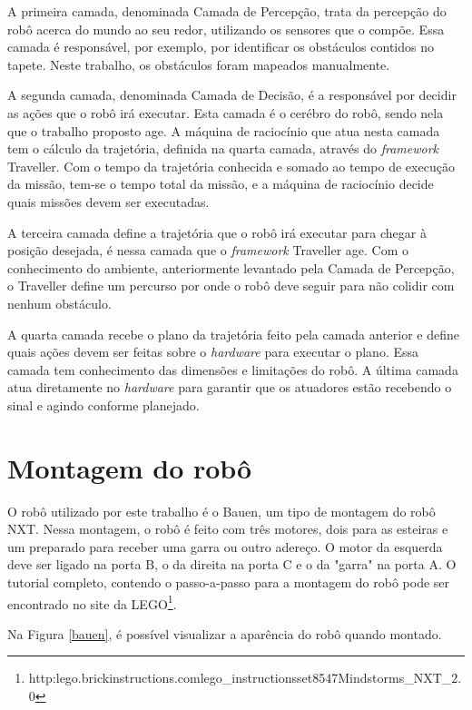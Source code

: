 A primeira camada, denominada Camada de Percepção, trata da percepção do robô acerca do mundo ao seu redor, utilizando os sensores que o compõe. Essa camada é responsável, por exemplo, por identificar os obstáculos contidos no tapete. Neste trabalho, os obstáculos foram mapeados manualmente.

A segunda camada, denominada Camada de Decisão, é a responsável por decidir as ações que o robô irá executar. Esta camada é o cerébro do robô, sendo nela que o trabalho proposto age. A máquina de raciocínio que atua nesta camada tem o cálculo da trajetória, definida na 	quarta camada, através do \textit{framework} Traveller. Com o tempo da trajetória conhecida e somado ao tempo de execução da missão, tem-se o tempo total da missão, e a máquina de raciocínio decide quais missões devem ser executadas.

A terceira camada define a trajetória que o robô irá executar para chegar à posição desejada, é nessa camada que o \textit{framework} Traveller age. Com o conhecimento do ambiente, anteriormente levantado pela Camada de Percepção, o Traveller define um percurso por onde o robô deve seguir para não colidir com nenhum obstáculo.

A quarta camada recebe o plano da trajetória feito pela camada anterior e define quais ações devem ser feitas sobre o \textit{hardware} para executar o plano. Essa camada tem conhecimento das dimensões e limitações do robô. A última camada atua diretamente no \textit{hardware} para garantir que os atuadores estão recebendo o sinal e agindo conforme planejado.
 
\section{Montagem do robô}
O robô utilizado por este trabalho é o Bauen, um tipo de montagem do robô NXT. Nessa montagem, o robô é feito com três motores, dois para as esteiras e um preparado para receber uma garra ou outro adereço. O motor da esquerda deve ser ligado na porta B, o da direita na porta C e o da "garra" na porta A. O tutorial completo, contendo o passo-a-passo para a montagem do robô pode ser encontrado no site da LEGO\footnote{http:\/\/lego.brickinstructions.com\/lego\_instructions\/set\/8547\/Mindstorms\_NXT\_2.0}. 

Na Figura \ref{bauen}, é possível visualizar a aparência do robô quando montado. 
\clearpage


